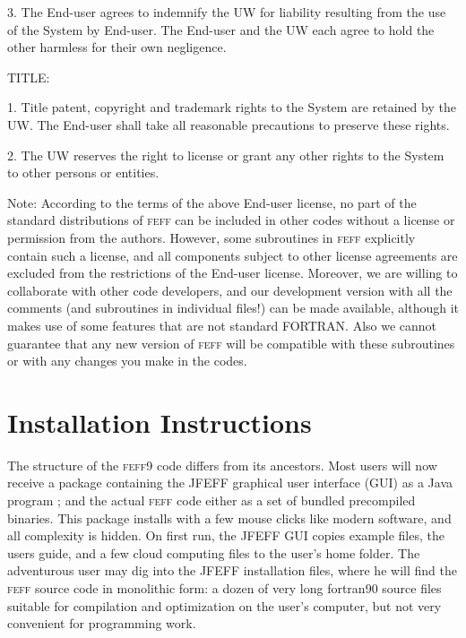 \documentclass[11pt,oneside]{report} %
\newcommand{\program}[1]{\textsc{#1}}
\newcommand{\feff}{\program{feff}}
\newcommand{\vnum}{9}
\newcommand{\feffcur}{\feff\vnum}
\begin{document}
\begin{latexonly}
 3. The End-user agrees to indemnify the UW for liability resulting
 from the use of the System by End-user. The End-user and the UW each
 agree to hold the other harmless for their own negligence.

 TITLE:

 1. Title patent, copyright and trademark rights to the System are
 retained by the UW. The End-user shall take all reasonable precautions
 to preserve these rights.

 2. The UW reserves the right to license or grant any other rights to
 the System to other persons or entities.


Note: According to the terms of the above End-user license, 
no part of the standard distributions of {\feff} can be included in other
codes without a license or permission from the authors. However, some subroutines
in {\feff} explicitly contain such a license, and all components subject to
other license agreements are excluded from the restrictions of the
End-user license. Moreover, we are willing to collaborate with other code
developers, and our development version with all the
comments (and subroutines in individual files!) can be made available,
although it makes use of some features that are not standard FORTRAN.
Also we cannot guarantee that any new version of {\feff} will be compatible 
with these subroutines or with any changes you make in the codes.




\chapter{Installation Instructions}
\label{sec:Append-B-Inst}
The structure of the {\feffcur} code differs from its ancestors.
Most users will now receive a package containing the JFEFF graphical user interface (GUI) as a Java program ; and the actual {\feff} code either as a set of bundled precompiled binaries.  This package installs with a few mouse clicks like modern software, and all complexity is hidden.  On first run, the JFEFF GUI copies example files, the users guide, and a few cloud computing files to the user's home folder.  The adventurous user may dig into the JFEFF installation files, where he will find the {\feff} source code in monolithic form: a dozen of very long fortran90 source files suitable for compilation and optimization on the user's computer, but not very convenient for programming work.


\end{latexonly}
\end{document}
